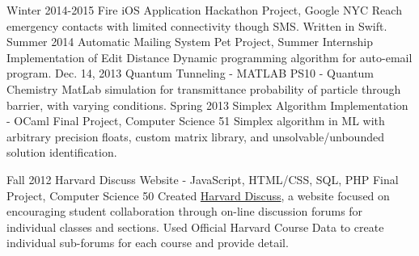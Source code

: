\documentclass[]{friggeri-cv} %
\begin{document}
\entry
{Winter 2014-2015}
{Fire iOS Application}
{Hackathon Project, Google NYC}
{Reach emergency contacts with limited connectivity though SMS. Written in Swift.}
\entry
{Summer 2014}
{Automatic Mailing System}
{Pet Project, Summer Internship}
{Implementation of Edit Distance Dynamic programming algorithm for auto-email program.}
\entry
{Dec. 14, 2013}
{Quantum Tunneling - MATLAB}
{PS10 - Quantum Chemistry}
{MatLab simulation for transmittance probability of particle through barrier, with varying conditions.}
\entry
{Spring 2013}
{Simplex Algorithm Implementation - OCaml}
{Final Project, Computer Science 51}
{Simplex algorithm in ML with arbitrary precision floats, custom matrix library, and unsolvable/unbounded solution identification.}
\begin{detailed}
\entry
{Fall 2012}
{Harvard Discuss Website - JavaScript, HTML/CSS, SQL, PHP}
{Final Project, Computer Science 50}
{Created \href{https://www.hcs.harvard.edu/~harvarddiscuss/index.php/en/}{Harvard Discuss}, a website focused on encouraging student collaboration through on-line discussion forums for individual classes and sections. Used Official Harvard Course Data to create individual sub-forums for each course and provide detail.}
\end{detailed}

\end{document}
